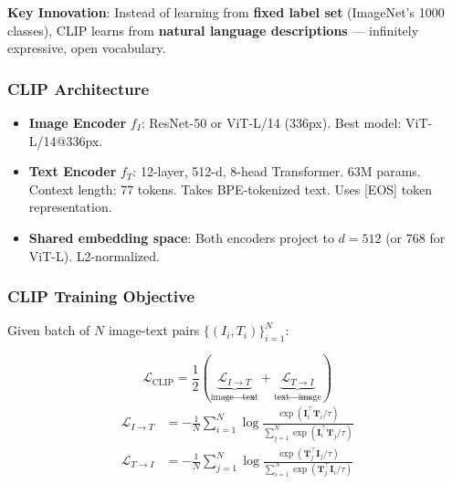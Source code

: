 \textbf{Key Innovation}: Instead of learning from \textbf{fixed label set} (ImageNet's 1000 classes), CLIP learns from \textbf{natural language descriptions} — infinitely expressive, open vocabulary.

\subsubsection{CLIP Architecture}
\begin{itemize}
\item \textbf{Image Encoder} $f_I$: ResNet-50 or ViT-L/14 (336px). Best model: ViT-L/14@336px.
\item \textbf{Text Encoder} $f_T$: 12-layer, 512-d, 8-head Transformer. 63M params. Context length: 77 tokens. Takes BPE-tokenized text. Uses [EOS] token representation.
\item \textbf{Shared embedding space}: Both encoders project to $d{=}512$ (or 768 for ViT-L). L2-normalized.
\end{itemize}

\subsubsection{CLIP Training Objective}
Given batch of $N$ image-text pairs $\{(I_i, T_i)\}_{i=1}^N$:

\begin{equation}\label{eq:clip_loss}
\boxed{\mathcal{L}_{\text{CLIP}} = \frac{1}{2}\!\left(\underbrace{\mathcal{L}_{I \to T}}_{\text{image} \to \text{text}} + \underbrace{\mathcal{L}_{T \to I}}_{\text{text} \to \text{image}}\right)}
\end{equation}
\begin{align}
\mathcal{L}_{I \to T} &= -\frac{1}{N}\sum_{i=1}^N \log \frac{\exp(\mathbf{I}_i^\top \mathbf{T}_i / \tau)}{\sum_{j=1}^N \exp(\mathbf{I}_i^\top \mathbf{T}_j / \tau)} \\
\mathcal{L}_{T \to I} &= -\frac{1}{N}\sum_{j=1}^N \log \frac{\exp(\mathbf{T}_j^\top \mathbf{I}_j / \tau)}{\sum_{i=1}^N \exp(\mathbf{T}_j^\top \mathbf{I}_i / \tau)}
\end{align}

